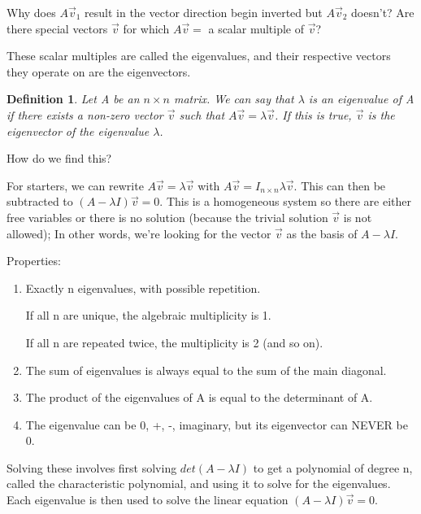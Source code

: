 \documentclass{article}
\newtheorem{definition}{Definition}
\begin{document}
Why does $A\vec{v}_1$ result in the vector direction begin inverted but $A\vec{v}_2$ doesn't? Are there special vectors $\vec{v}$ for
which $A\vec{v}=$ a scalar multiple of $\vec{v}$?

These scalar multiples are called the eigenvalues, and their respective vectors they operate on are the eigenvectors.

\begin{definition}
	Let A be an $n\times n$ matrix. We can say that $\lambda$ is an eigenvalue of A if there exists a \emph{non-zero} vector 
	$\vec{v}$ such that $A\vec{v}=\lambda \vec{v}$. If this is true, $\vec{v}$ is the eigenvector of the eigenvalue $\lambda$.
\end{definition}

How do we find this?

For starters, we can rewrite $A\vec{v}=\lambda\vec{v}$ with $A\vec{v}=I_{n\times n}\lambda\vec{v}$. This can then be subtracted to
$(A-\lambda I)\vec{v}=0$. This is a homogeneous system so there are either free variables or there is no solution (because the trivial
solution $\vec{v}$ is not allowed); In other words, we're looking for the vector $\vec{v}$ as the basis of $A-\lambda I$.

Properties:
\begin{enumerate}
	\item Exactly n eigenvalues, with possible repetition.
		
		If all n are unique, the algebraic multiplicity is 1.
		
		If all n are repeated twice, the multiplicity is 2 (and so on).
	\item The sum of eigenvalues is always equal to the sum of the main diagonal.
	\item The product of the eigenvalues of A is equal to the determinant of A.
	\item The eigenvalue can be 0, +, -, imaginary, but its eigenvector can NEVER be 0.
\end{enumerate}

Solving these involves first solving $det(A-\lambda I)$ to get a polynomial of degree n, called the characteristic polynomial, and
using it to solve for the eigenvalues. Each eigenvalue is then used to solve the linear equation $(A-\lambda I)\vec{v}=0$.
\end{document}
